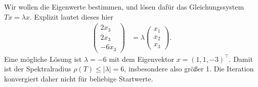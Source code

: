 \documentclass[english, parskip=full]{scrartcl}
\begin{document}
Wir wollen die Eigenwerte bestimmen, und lösen dafür das Gleichungssystem $Tx = \lambda x$.
Explizit lautet dieses hier
\begin{align}
\begin{pmatrix}
2x_3 \\ 2x_3 \\ -6x_3
\end{pmatrix} &= \lambda\begin{pmatrix}
x_1 \\ x_2 \\ x_3
\end{pmatrix}.
\end{align}
Eine mögliche Lösung ist $\lambda = -6$ mit dem Eigenvektor $x = (1,1,-3)^\top$.
Damit ist der Spektralradius $\rho(T) \le |\lambda| = 6$, insbesondere also größer 1.
Die Iteration konvergiert daher nicht für beliebige Startwerte.
\end{document}
